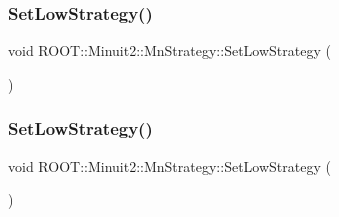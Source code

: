 \subsubsection{\texorpdfstring{SetLowStrategy()}{SetLowStrategy()}\hspace{0.1cm}{\footnotesize\ttfamily [1/2]}}
{\footnotesize\ttfamily void R\+O\+O\+T\+::\+Minuit2\+::\+Mn\+Strategy\+::\+Set\+Low\+Strategy (\begin{DoxyParamCaption}{ }\end{DoxyParamCaption})}

\mbox{\label{classROOT_1_1Minuit2_1_1MnStrategy_a24671e2ae8a1224583adfcb3fb73ad55}} 
\subsubsection{\texorpdfstring{SetLowStrategy()}{SetLowStrategy()}\hspace{0.1cm}{\footnotesize\ttfamily [2/2]}}
{\footnotesize\ttfamily void R\+O\+O\+T\+::\+Minuit2\+::\+Mn\+Strategy\+::\+Set\+Low\+Strategy (\begin{DoxyParamCaption}{ }\end{DoxyParamCaption})}

